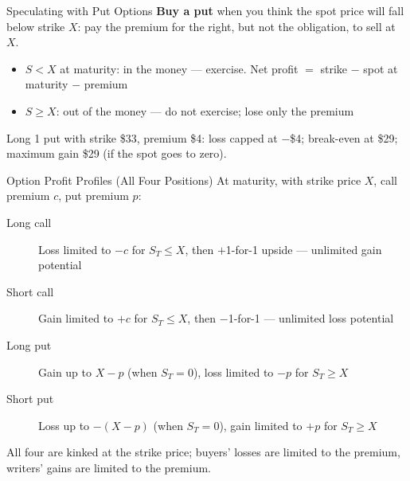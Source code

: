 \documentclass[aspectratio=169]{beamer}
\begin{document}
\begin{frame}{Speculating with Put Options}
\textbf{Buy a put} when you think the spot price will fall below strike $X$: pay the premium for the right, but not the obligation, to sell at $X$.
\begin{itemize}
  \item $S < X$ at maturity: in the money --- exercise. Net profit $=$ strike $-$ spot at maturity $-$ premium
  \item $S \ge X$: out of the money --- do not exercise; lose only the premium
\end{itemize}
\begin{center}
\end{center}
Long 1 put with strike \$33, premium \$4: loss capped at $-$\$4; break-even at \$29; maximum gain \$29 (if the spot goes to zero).
\end{frame}

\begin{frame}{Option Profit Profiles (All Four Positions)}
At maturity, with strike price $X$, call premium $c$, put premium $p$:
\begin{description}
  \item[Long call] Loss limited to $-c$ for $S_T \le X$, then $+$1-for-1 upside --- unlimited gain potential
  \item[Short call] Gain limited to $+c$ for $S_T \le X$, then $-$1-for-1 --- unlimited loss potential
  \item[Long put] Gain up to $X-p$ (when $S_T = 0$), loss limited to $-p$ for $S_T \ge X$
  \item[Short put] Loss up to $-(X-p)$ (when $S_T = 0$), gain limited to $+p$ for $S_T \ge X$
\end{description}
\vspace{0.3em}
All four are kinked at the strike price; buyers' losses are limited to the premium, writers' gains are limited to the premium.
\end{frame}
\end{document}
